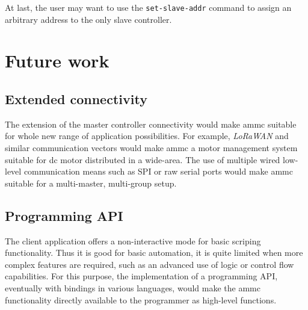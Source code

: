 At last, the user may want to use the \texttt{set-slave-addr} command to assign
an arbitrary address to the only slave controller.

\section{Future work}

\subsection{Extended connectivity}
The extension of the master controller connectivity would make ammc suitable
for whole new range of application possibilities. For example, \emph{LoRaWAN}
and similar communication vectors would make ammc a motor management system
suitable for dc motor distributed in a wide-area. The use of multiple wired
low-level communication means such as SPI or raw serial ports would make ammc
suitable for a multi-master, multi-group setup.

\subsection{Programming API}
The client application offers a non-interactive mode for basic scriping
functionality. Thus it is good for basic automation, it is quite limited when
more complex features are required, such as an advanced use of logic or control
flow capabilities. For this purpose, the implementation of a programming API,
eventually with bindings in various languages, would make the ammc
functionality directly available to the programmer as high-level functions.
